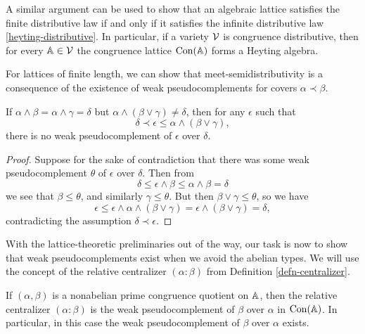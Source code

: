 \begin{appendices}
\begin{rem} A similar argument can be used to show that an algebraic lattice satisfies the finite distributive law if and only if it satisfies the infinite distributive law \eqref{heyting-distributive}. In particular, if a variety $\mathcal{V}$ is congruence distributive, then for every $\mathbb{A} \in \mathcal{V}$ the congruence lattice $\operatorname{Con}(\mathbb{A})$ forms a Heyting algebra.
\end{rem}


For lattices of finite length, we can show that meet-semidistributivity is a consequence of the existence of weak pseudocomplements for covers $\alpha \prec \beta$.

\begin{prop}\label{prop-semidistributive-prime-pseudocomplement} If $\alpha \wedge \beta = \alpha \wedge \gamma = \delta$ but $\alpha \wedge (\beta \vee \gamma) \ne \delta$, then for any $\epsilon$ such that
\[
\delta \prec \epsilon \le \alpha \wedge (\beta \vee \gamma),
\]
there is no weak pseudocomplement of $\epsilon$ over $\delta$.
\end{prop}
\begin{proof} Suppose for the sake of contradiction that there was some weak pseudocomplement $\theta$ of $\epsilon$ over $\delta$. Then from
\[
\delta \le \epsilon \wedge \beta \le \alpha \wedge \beta = \delta
\]
we see that $\beta \le \theta$, and similarly $\gamma \le \theta$. But then $\beta \vee \gamma \le \theta$, so we have
\[
\epsilon \le \epsilon \wedge \alpha \wedge (\beta \vee \gamma) = \epsilon \wedge (\beta \vee \gamma) = \delta,
\]
contradicting the assumption $\delta \prec \epsilon$.
\end{proof}

With the lattice-theoretic preliminaries out of the way, our task is now to show that weak pseudocomplements exist when we avoid the abelian types. We will use the concept of the relative centralizer $(\alpha : \beta)$ from Definition \ref{defn-centralizer}.

\begin{prop}\label{prop-centralizer-pseudocomplement} If $(\alpha, \beta)$ is a nonabelian prime congruence quotient on $\mathbb{A}$, then the relative centralizer $(\alpha : \beta)$ is the weak pseudocomplement of $\beta$ over $\alpha$ in $\operatorname{Con}(\mathbb{A})$. In particular, in this case the weak pseudocomplement of $\beta$ over $\alpha$ exists.


\end{prop}
\end{appendices}
